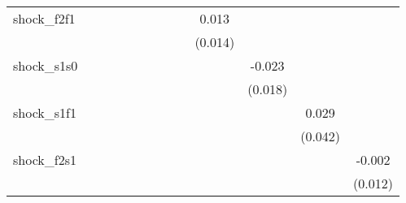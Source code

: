 {\begin{tabular}{l*{12}{c}}
\addlinespace
shock\_f2f1  &                     &                     &                     &                     &                     &                     &                     &                     &       0.013         &                     &                     &                     \\
            &                     &                     &                     &                     &                     &                     &                     &                     &     (0.014)         &                     &                     &                     \\
\addlinespace
shock\_s1s0  &                     &                     &                     &                     &                     &                     &                     &                     &                     &      -0.023         &                     &                     \\
            &                     &                     &                     &                     &                     &                     &                     &                     &                     &     (0.018)         &                     &                     \\
\addlinespace
shock\_s1f1  &                     &                     &                     &                     &                     &                     &                     &                     &                     &                     &       0.029         &                     \\
            &                     &                     &                     &                     &                     &                     &                     &                     &                     &                     &     (0.042)         &                     \\
\addlinespace
shock\_f2s1  &                     &                     &                     &                     &                     &                     &                     &                     &                     &                     &                     &      -0.002         \\
            &                     &                     &                     &                     &                     &                     &                     &                     &                     &                     &                     &     (0.012)         \\

\end{tabular}}
